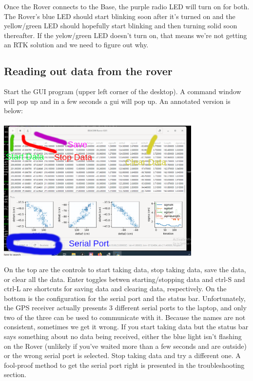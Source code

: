\documentclass[usletter]{article}
\begin{document}
Once the Rover connects to the Base, the purple radio LED will turn on for
both. The Rover's blue LED should start blinking soon after it's turned on and
the yellow/green LED should hopefully start blinking and then turning solid
soon thereafter. If the yelow/green LED doesn't turn on, that means we're not
getting an RTK solution and we need to figure out why. 

\subsection{Reading out data from the rover} 

Start the GUI program (upper left corner of the desktop). A command window will pop up and in a few seconds a gui will pop up. An annotated version is below:

\begin{center} 
\includegraphics[width=4in]{gui} 
\end{center} 

On the top are the controls to start taking data, stop taking data, save the data, or clear all the data. Enter toggles betwen starting/stopping data and ctrl-S and ctrl-L are shortcuts for saving data and clearing data, respectively. 
On the bottom is  the configuration for the serial port and the status bar. Unfortunately, the GPS receiver actually presents 3 different serial ports to the laptop, and only two of the three can be used to communicate with it. Because the names are not consistent, sometimes we get it wrong. If you start taking data but the status bar says something about no data being received, either the blue light isn't flashing on the Rover (unlikely if you've waited more than a few seconds and are outside) or the wrong serial port is selected. Stop taking data and try a different one. 
A fool-proof method to get the serial port right is presented in the troubleshooting section.
\end{document}
